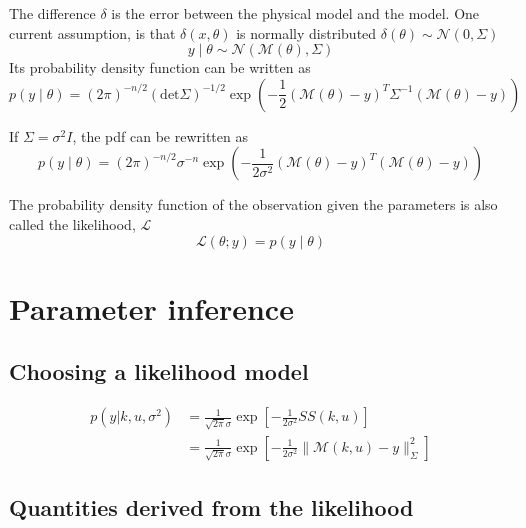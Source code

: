 \documentclass[a4paper,11pt]{article}
\theoremstyle{defi}
\numberwithin{thmCounter}{section}
\begin{document}
The difference $\delta$ is the error between the physical model and the model.
One current assumption, is that $\delta(x, \theta)$ is normally distributed $\delta(\theta) \sim \mathcal{N}(0, \Sigma)$ 
\begin{equation}
  y\mid \theta \sim \mathcal{N}(\mathcal{M}(\theta), \Sigma)
\end{equation}
Its probability density function can be written as
\begin{equation}
  p(y\mid \theta) = (2\pi)^{-n/2}(\mathrm{det} \Sigma)^{-1/2}\exp\left(-\frac{1}{2}(\mathcal{M}(\theta) - y)^T\Sigma^{-1}(\mathcal{M}(\theta) - y)\right)
\end{equation}
\begin{remark}
  If $\Sigma = \sigma^2 I$, the pdf can be rewritten as
  \begin{equation*}
    p(y \mid \theta) = (2\pi)^{-n/2} \sigma^{-n} \exp\left(-\frac{1}{2\sigma^2}(\mathcal{M}(\theta) - y)^T(\mathcal{M}(\theta) - y)\right)
  \end{equation*}
\end{remark}

\begin{definition}
  The probability density function of the observation given the parameters is also called the likelihood, $\mathcal{L}$
  \begin{equation}
    \label{eq:likelihood_definition}
    \mathcal{L}(\theta;y) = p(y \mid \theta)
  \end{equation}
\end{definition}
\section{Parameter inference}
\subsection{Choosing a likelihood model}
\begin{align*}
  p(y | k, u, \sigma^2) &= \frac{1}{\sqrt{2\pi}\sigma}\exp\left[-\frac{1}{2\sigma^2}SS(k,u)\right] \\
                         &= \frac{1}{\sqrt{2\pi}\sigma}\exp\left[-\frac{1}{2\sigma^2} \|\mathcal{M}(k,u) - y \|^2_{\Sigma}\right]
\end{align*}
\subsection{Quantities derived from the likelihood}
\end{document}
